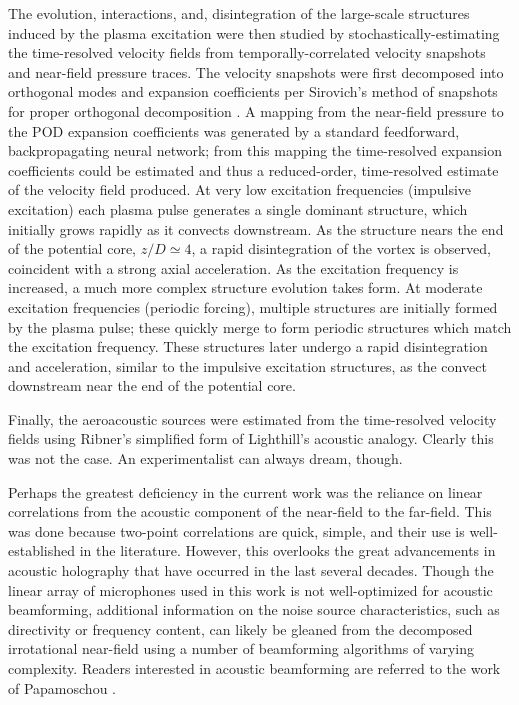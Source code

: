 The evolution, interactions, and, disintegration of the large-scale structures induced by the plasma excitation were then studied by stochastically-estimating the time-resolved velocity fields from temporally-correlated velocity snapshots and near-field pressure traces.
The velocity snapshots were first decomposed into orthogonal modes and expansion coefficients per Sirovich's method of snapshots for proper orthogonal decomposition \citep{Sirovich1987}.
A mapping from the near-field pressure to the POD expansion coefficients was generated by a standard feedforward, backpropagating neural network; from this mapping the time-resolved expansion coefficients could be estimated and thus a reduced-order, time-resolved estimate of the velocity field produced.
At very low excitation frequencies (impulsive excitation) each plasma pulse generates a single dominant structure, which initially grows rapidly as it convects downstream. 
As the structure nears the end of the potential core, $z/D \simeq 4$, a rapid disintegration of the vortex is observed, coincident with a strong axial acceleration.
As the excitation frequency is increased, a much more complex structure evolution takes form.
At moderate excitation frequencies (periodic forcing), multiple structures are initially formed by the plasma pulse; these quickly merge to form periodic structures which match the excitation frequency.
These structures later undergo a rapid disintegration and acceleration, similar to the impulsive excitation structures, as the convect downstream near the end of the potential core. 

Finally, the aeroacoustic sources were estimated from the time-resolved velocity fields using Ribner's simplified form of Lighthill's acoustic analogy.
Clearly this was not the case. An experimentalist can always dream, though.

Perhaps the greatest deficiency in the current work was the reliance on linear correlations from the acoustic component of the near-field to the far-field.
This was done because two-point correlations are quick, simple, and their use is well-established in the literature.
However, this overlooks the great advancements in acoustic holography that have occurred in the last several decades.
Though the linear array of microphones used in this work is not well-optimized for acoustic beamforming, additional information on the noise source characteristics, such as directivity or frequency content, can likely be gleaned from the decomposed irrotational near-field using a number of beamforming algorithms of varying complexity.
Readers interested in acoustic beamforming are referred to the work of Papamoschou \citep{Papamoschou2011}.